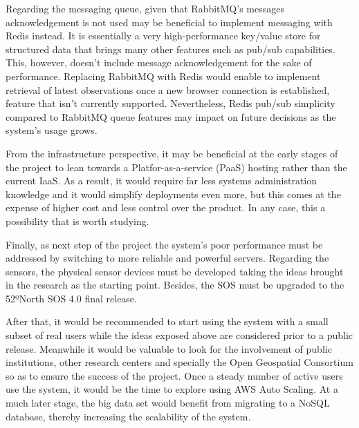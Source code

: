 Regarding the messaging queue, given that RabbitMQ's messages acknowledgement is not used may be beneficial to implement messaging with Redis instead. It is essentially a very high-performance key/value store for structured data that brings many other features such as pub/sub capabilities. This, however, doesn't include message acknowledgement for the sake of performance. Replacing RabbitMQ with Redis would enable to implement retrieval of latest observations once a new browser connection is established, feature that isn't currently supported. Nevertheless, Redis pub/sub simplicity compared to RabbitMQ queue features may impact on future decisions as the system's usage grows.

From the infrastructure perspective, it may be beneficial at the early stages of the project to lean towards a Platfor-as-a-service (PaaS) hosting rather than the current IaaS. As a result, it would require far less systems administration knowledge and it would simplify deployments even more, but this comes at the expense of higher cost and less control over the product. In any case, this a possibility that is worth studying.

Finally, as next step of the project the system's poor performance must be addressed by switching to more reliable and powerful servers. Regarding the sensors, the physical sensor devices must be developed taking the ideas brought in the research as the starting point. Besides, the SOS must be upgraded to the 52ºNorth SOS 4.0 final release.

After that, it would be recommended to start using the system with a small subset of real users while the ideas exposed above are considered prior to a public release. Meanwhile it would be valuable to look for the involvement of public institutions, other research centers and specially the Open Geospatial Consortium so as to ensure the success of the project. Once a steady number of active users use the system, it would be the time to explore using AWS Auto Scaling. At a much later stage, the big data set would benefit from migrating to a NoSQL database, thereby increasing the scalability of the system.